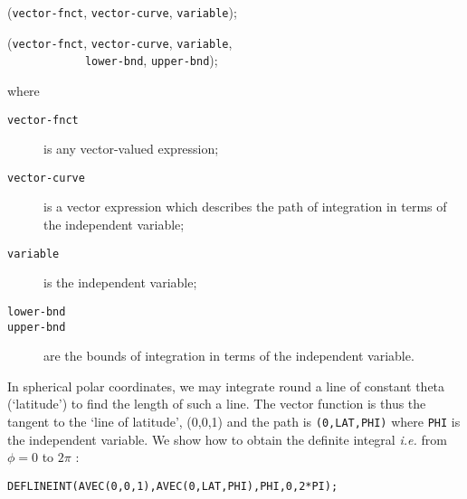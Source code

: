 ({\tt vector-fnct}, {\tt vector-curve},
{\tt variable});

({\tt vector-fnct}, {\tt vector-curve},
{\tt variable},\\
\noindent\verb+            +{\tt lower-bnd}, {\tt upper-bnd});

\noindent where
\begin{description}
\item[{\tt vector-fnct}] is any vector-valued expression;
\item[{\tt vector-curve}] is a vector expression which describes the path of
integration in terms of the independent variable;
\item[{\tt variable}] is the independent variable;
\item[{\tt lower-bnd}]
\item[{\tt upper-bnd}] are the bounds of integration in terms of the
independent variable.
\end{description}

\example{}

In spherical polar coordinates, we may integrate round a line of
constant theta (`latitude') to find the length of such a line. The
vector function is thus the tangent to the `line of latitude', (0,0,1)
and the path is {\tt (0,LAT,PHI)} where {\tt PHI} is the independent
variable. We show how to obtain the definite integral {\em i.e.} from
$\phi=0$ to $2 \pi$ :
\begin{verbatim}
DEFLINEINT(AVEC(0,0,1),AVEC(0,LAT,PHI),PHI,0,2*PI);
\end{verbatim}

